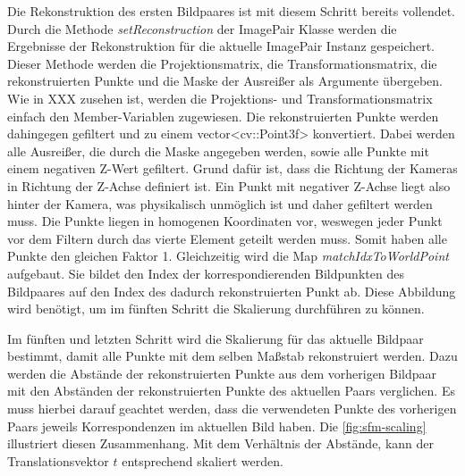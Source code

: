 Die Rekonstruktion des ersten Bildpaares ist mit diesem Schritt bereits vollendet.
Durch die Methode \emph{setReconstruction} der ImagePair Klasse werden die Ergebnisse der Rekonstruktion für die aktuelle ImagePair Instanz gespeichert.
Dieser Methode werden die Projektionsmatrix, die Transformationsmatrix, die rekonstruierten Punkte und die Maske der Ausreißer als Argumente übergeben. 
Wie in XXX zusehen ist, werden die Projektions- und Transformationsmatrix einfach den Member-Variablen zugewiesen.
Die rekonstruierten Punkte werden dahingegen gefiltert und zu einem vector<cv::Point3f> konvertiert.
Dabei werden alle Ausreißer, die durch die Maske angegeben werden, sowie alle Punkte mit einem negativen Z-Wert gefiltert.
Grund dafür ist, dass die Richtung der Kameras in Richtung der Z-Achse definiert ist.
Ein Punkt mit negativer Z-Achse liegt also hinter der Kamera, was physikalisch unmöglich ist und daher gefiltert werden muss.
Die Punkte liegen in homogenen Koordinaten vor, weswegen jeder Punkt vor dem Filtern durch das vierte Element geteilt werden muss.
Somit haben alle Punkte den gleichen Faktor 1.
Gleichzeitig wird die Map \emph{matchIdxToWorldPoint} aufgebaut.
Sie bildet den Index der korrespondierenden Bildpunkten des Bildpaares auf den Index des dadurch rekonstruierten Punkt ab.
Diese Abbildung wird benötigt, um im fünften Schritt die Skalierung durchführen zu können.

Im fünften und letzten Schritt wird die Skalierung für das aktuelle Bildpaar bestimmt, damit alle Punkte mit dem selben Maßstab rekonstruiert werden.  
Dazu werden die Abstände der rekonstruierten Punkte aus dem vorherigen Bildpaar mit den Abständen der rekonstruierten Punkte des aktuellen Paars verglichen.
Es muss hierbei darauf geachtet werden, dass die verwendeten Punkte des vorherigen Paars jeweils Korrespondenzen im aktuellen Bild haben.
Die \cref{fig:sfm-scaling} illustriert diesen Zusammenhang.
Mit dem Verhältnis der Abstände, kann der Translationsvektor $t$ entsprechend skaliert werden.

